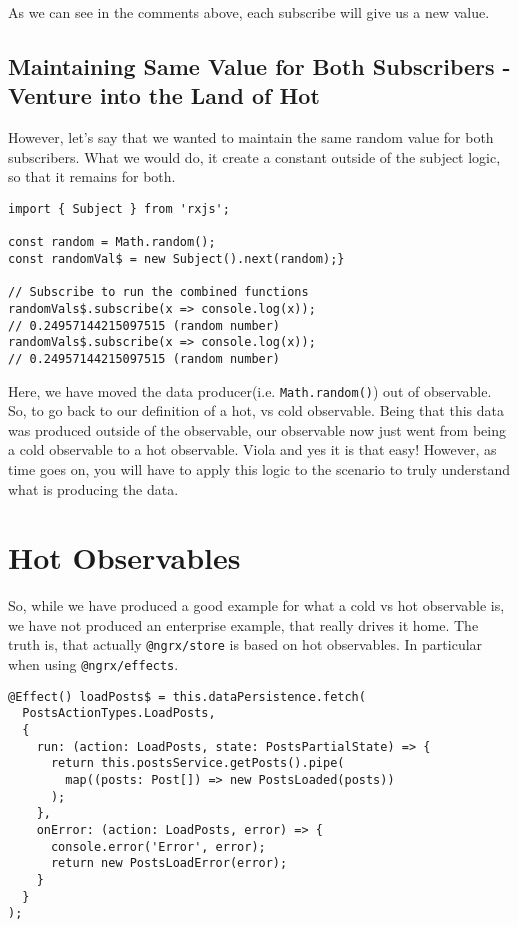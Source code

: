 As we can see in the comments above, each subscribe will give us a new value.

\subsection{Maintaining Same Value for Both Subscribers - Venture into the Land of Hot}
However, let's say that we wanted to maintain the same random value for 
both subscribers. What we would do, it create a constant outside of the 
subject logic, so that it remains for both. 

\begin{lstlisting}[caption=Turning Cold into Hot]
import { Subject } from 'rxjs';

const random = Math.random();
const randomVal$ = new Subject().next(random);}

// Subscribe to run the combined functions
randomVals$.subscribe(x => console.log(x));
// 0.24957144215097515 (random number)
randomVals$.subscribe(x => console.log(x));
// 0.24957144215097515 (random number)
\end{lstlisting}

Here, we have moved the data producer(i.e. \lstinline{Math.random()}) out of observable. So, to go back to our definition of a hot, vs cold observable. Being that this data was produced outside of the observable, our observable now just went from being a cold observable to a hot observable. Viola and yes it is that easy! However, as time goes on, you will have to apply this logic to the scenario to truly understand what is producing the data.

\section{Hot Observables}
So, while we have produced a good example for what a cold vs hot observable is, we have not produced an enterprise example, that really drives it home. The truth is, that actually \lstinline{@ngrx/store} is based on hot observables. In particular when using \lstinline{@ngrx/effects}. 
\begin{lstlisting}
@Effect() loadPosts$ = this.dataPersistence.fetch(
  PostsActionTypes.LoadPosts,
  {
    run: (action: LoadPosts, state: PostsPartialState) => {
      return this.postsService.getPosts().pipe(
        map((posts: Post[]) => new PostsLoaded(posts))
      );
    },
    onError: (action: LoadPosts, error) => {
      console.error('Error', error);
      return new PostsLoadError(error);
    }
  }
);  
\end{lstlisting}


